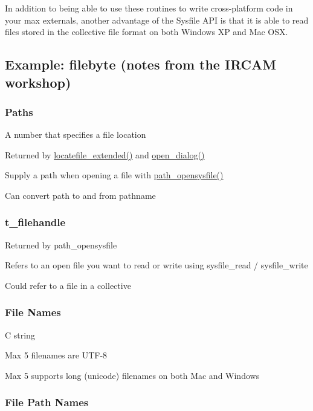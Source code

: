 In addition to being able to use these routines to write cross-\/platform code in your max externals, another advantage of the Sysfile API is that it is able to read files stored in the collective file format on both Windows XP and Mac OSX.\hypertarget{group__files_filebyte_example}{}\subsection{Example: filebyte (notes from the IRCAM workshop)}\label{group__files_filebyte_example}
\hypertarget{group__files_paths}{}\subsubsection{Paths}\label{group__files_paths}

\begin{DoxyItemize}
\item A number that specifies a file location
\item Returned by \hyperlink{group__files_gaa2899b66e1457da0ee333f9407230ccd}{locatefile\_\-extended()} and \hyperlink{group__files_ga0d8fd0b13e2e623298a45e846af3fe1a}{open\_\-dialog()}
\item Supply a path when opening a file with \hyperlink{group__files_gaf244aeb070e1903461070cd7dbe04bf4}{path\_\-opensysfile()}
\item Can convert path to and from pathname
\end{DoxyItemize}\hypertarget{group__files_filehandle}{}\subsubsection{t\_\-filehandle}\label{group__files_filehandle}

\begin{DoxyItemize}
\item Returned by path\_\-opensysfile
\item Refers to an open file you want to read or write using sysfile\_\-read / sysfile\_\-write
\item Could refer to a file in a collective
\end{DoxyItemize}\hypertarget{group__files_filenames}{}\subsubsection{File Names}\label{group__files_filenames}

\begin{DoxyItemize}
\item C string
\item Max 5 filenames are UTF-\/8
\item Max 5 supports long (unicode) filenames on both Mac and Windows
\end{DoxyItemize}\hypertarget{group__files_filepathname}{}\subsubsection{File Path Names}\label{group__files_filepathname}

